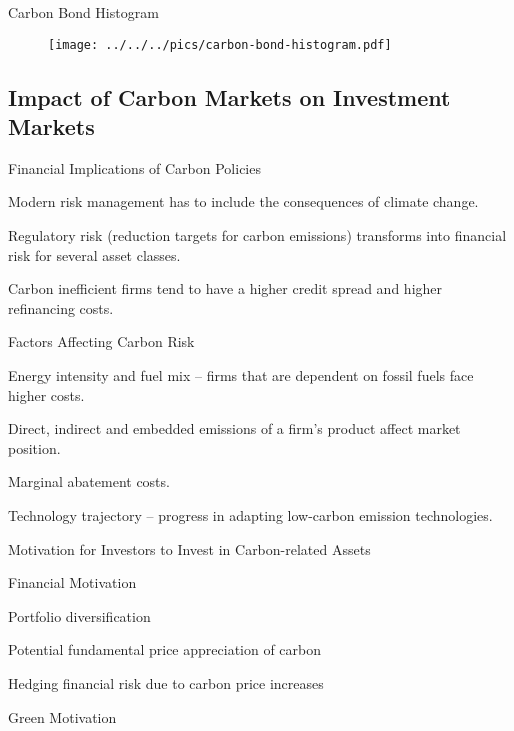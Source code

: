 {Carbon Bond Histogram}
\begin{figure}[h!]
\centering
\texttt{[image: ../../../pics/carbon-bond-histogram.pdf]}
\label{fig:Carbon-Bond-Histogram}
\end{figure}

\subsection{Impact of Carbon Markets on Investment Markets}

{Financial Implications of Carbon Policies}


	Modern risk management has to include the consequences of climate change.

	Regulatory risk (reduction targets for carbon emissions) transforms into financial risk  for several asset classes.

	Carbon inefficient firms tend to have a higher credit spread and higher refinancing costs.


{Factors Affecting Carbon Risk}


	Energy intensity and fuel mix -- firms that are dependent on fossil fuels face higher costs.

	Direct, indirect and embedded emissions of a firm's product affect market position.

	Marginal abatement costs.

	Technology trajectory -- progress in adapting low-carbon emission technologies.


{Motivation for Investors to Invest in Carbon-related Assets}


	Financial Motivation


	Portfolio diversification

	Potential fundamental price appreciation of carbon

	Hedging financial risk due to carbon price increases


	Green Motivation


